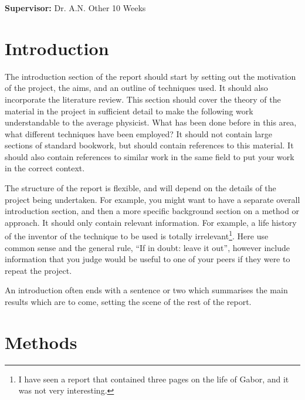 \documentclass[a4paper,12pt]{article}
\begin{document}
\vfill
{\bf Supervisor:} Dr. A.N. Other                 %
\hfill
10 Weeks                                         %
\newpage
%
\pagestyle{plain}                               %
\setcounter{page}{1}                            %
\tableofcontents                                %
\section{Introduction}

The introduction section of the report should start by setting out the
motivation of the project, the aims, and an outline of techniques used.
It should also incorporate the literature review. This section should 
cover the theory of the material in the project in sufficient detail to 
make the following work understandable to the average physicist. What has 
been done before in this area, what different techniques have been 
employed? It should not contain large sections of standard
bookwork, but should contain references to this material. It should also 
contain references to similar work in the same field to put your work in 
the correct context.

The structure of the report is flexible, and will depend on the details
of the project being undertaken. For example, you might want to have a 
separate overall introduction section, and then a more specific background section 
on a method or approach. It should only contain relevant information. For example, 
a life history of the inventor of the technique to be used is
totally irrelevant\footnote{I have seen a report that contained three pages
on the life of Gabor, and it was not very interesting.}. Here use common sense
and the general rule, ``If in doubt: leave it out'', however
include information that you judge would be useful to one of your
peers if they were to repeat the project.

An introduction often ends with a sentence or two which summarises the main
results which are to come, setting the scene of the rest of the report. 




\section{Methods}
\end{document}
